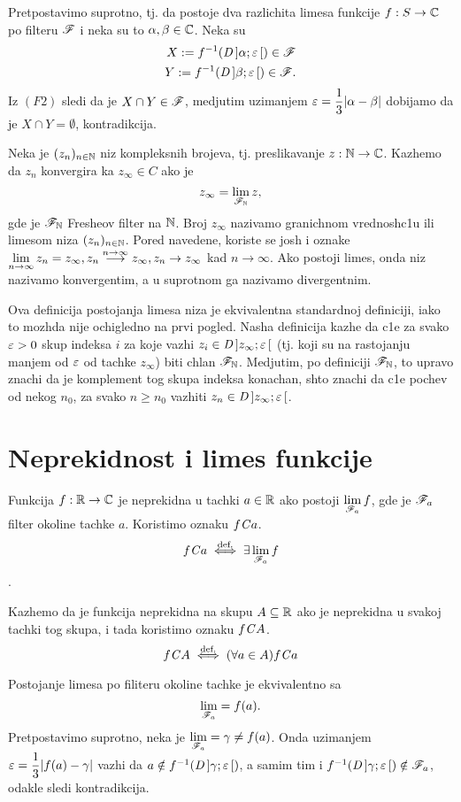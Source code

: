 \documentclass[../maing.tex]{subfiles}
\begin{document}
    \dok Pretpostavimo suprotno, tj. da postoje dva razlichita limesa funkcije $f:S\to \mathbb{C}$ po filteru $\mathscr{F}$  i neka su to $\alpha, \beta \in \mathbb{C}$. Neka su 
    \begin{align*}
        X:= f^{-1}(\mathit{D}\,]\alpha;\varepsilon\,[) \in \mathscr{F}\\
        Y:= f^{-1}(\mathit{D}\,]\beta;\varepsilon\,[) \in \mathscr{F}.
    \end{align*}
    Iz $(F2)$ sledi da je $X\cap Y\in \mathscr{F}$, medjutim uzimanjem $\varepsilon=\dfrac{1}{3}|\alpha-\beta|$ dobijamo da je $X\cap Y=\emptyset$, kontradikcija.

    Neka je $(z_n)_{n\in \mathbb{N}}$ niz kompleksnih brojeva, tj. preslikavanje $z:\mathbb{N} \to \mathbb{C}$. Kazhemo da $z_n$ konvergira ka $z_\infty\in C$ ako je \[z_\infty=\lim_{\mathscr{F}_{\mathbb{N}}}z,\] gde je $\mathscr{F}_{\mathbb{N}}$ Fresheov filter na $\mathbb{N}$. Broj $z_\infty$ nazivamo granichnom vrednosh\-c1u ili limesom niza  $(z_n)_{n\in \mathbb{N}}$. Pored navedene, koriste se josh i oznake $\displaystyle{\lim_{n\to\infty}z_n=z_\infty,z_n\overset{n\to\infty}{\longrightarrow}z_\infty,z_n\to z_\infty}$ kad $n\to \infty$. Ako postoji limes, onda niz nazivamo konvergentim, a u suprotnom ga nazivamo divergentnim.

    Ova definicija postojanja limesa niza je ekvivalentna standardnoj definiciji, iako to mozhda nije ochigledno na prvi pogled. Nasha definicija kazhe da c1e za svako $\varepsilon>0$ skup indeksa $i$ za koje vazhi $z_i\in \mathit{D}\,]z_\infty;\varepsilon\,[$ (tj. koji su na rastojanju manjem od $\varepsilon$ od tachke $z_\infty$) biti chlan $\mathscr{F}_{\mathbb{N}}$. Medjutim, po definiciji $\mathscr{F}_{\mathbb{N}}$, to upravo znachi da je komplement tog skupa indeksa konachan, shto znachi da c1e pochev od nekog $n_0$, za svako $n\geq n_0$ vazhiti $z_n\in \mathit{D}\,]z_\infty;\varepsilon\,[$.

\section{Neprekidnost i limes funkcije}
    \begin{de}\label{defnepr}
     Funkcija $f:\mathbb{R} \to \mathbb{C}$ je neprekidna u tachki $a\in \mathbb{R}$ ako postoji $\displaystyle{\lim_{\mathscr{F}_a}f}$, gde je $\mathscr{F}_a$ filter okoline tachke $a$. Koristimo oznaku $f \mathit{C} a$.\[f\mathit{C} a \overset{\text{def.}}{\iff} \exists \lim_{\mathscr{F}_a}f\].
        \end{de}
    Kazhemo da je funkcija neprekidna na skupu $A\subseteq \mathbb{R}$ ako je neprekidna u svakoj tachki tog skupa, i tada koristimo oznaku $f\mathit{C} A$.
    \[f\mathit{C} A \overset{\text{def.}}{\iff} (\forall a\in A) f\mathit{C} a\]

    \nap Postojanje limesa po filiteru okoline tachke je ekvivalentno sa $$\lim_{\mathscr{F}_a}=f(a).$$ Pretpostavimo suprotno, neka je $\displaystyle{\lim_{\mathscr{F}_a}=\gamma\neq f(a)}$. Onda uzimanjem $\varepsilon=\dfrac{1}{3}|f(a)-\gamma|$ vazhi da $a\notin f^{-1}(\mathit{D}\,]\gamma;\varepsilon\,[)$, a samim tim i $ f^{-1}(\mathit{D}\,]\gamma;\varepsilon\,[)\notin \mathscr{F}_a$, odakle sledi kontradikcija.
\end{document}
